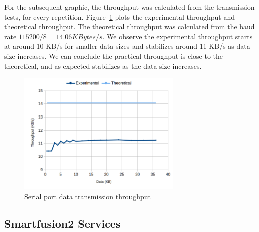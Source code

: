 For the subsequent graphic, the throughput was calculated from the transmission tests, for every repetition.
Figure~\ref{fig:comms:tput} plots the experimental throughput and theoretical throughput. The theoretical throughput was calculated from the baud rate \(115200/8 = 14.06 KBytes/s\).
We observe the experimental throughput starts at around 10 KB/s for smaller data sizes and stabilizes around 11 KB/s as data size increases.
We can conclude the practical throughput is close to the theoretical, and as expected stabilizes as the data size increases.

\begin{figure}[h!]
	\centering
	\includegraphics[width=0.7\textwidth]{./Images/comms-tput.png}
	\caption{Serial port data transmission throughput}
	\label{fig:comms:tput}
\end{figure}

\subsection{Smartfusion2 Services}\label{chap:evaluation:board}

